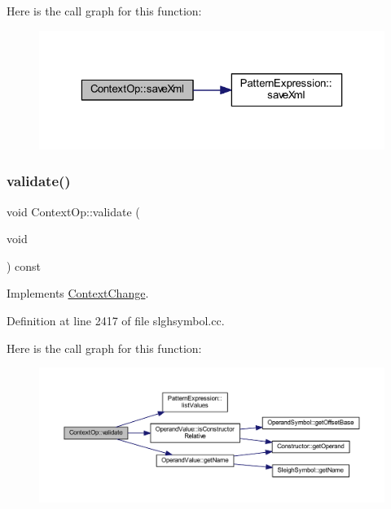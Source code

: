Here is the call graph for this function\+:
\nopagebreak
\begin{figure}[H]
\begin{center}
\leavevmode
\includegraphics[width=323pt]{class_context_op_ab0ddc8b720a9958f4dff5dae7f6cd288_cgraph}
\end{center}
\end{figure}
\mbox{\label{class_context_op_af3861ab0ca59793e1ed5d361fce4eb34}} 
\subsubsection{\texorpdfstring{validate()}{validate()}}
{\footnotesize\ttfamily void Context\+Op\+::validate (\begin{DoxyParamCaption}\item[{void}]{ }\end{DoxyParamCaption}) const\hspace{0.3cm}{\ttfamily [virtual]}}



Implements \mbox{\hyperlink{class_context_change_a9a9263347e16d2e396e3963a43eb7ea8}{Context\+Change}}.



Definition at line 2417 of file slghsymbol.\+cc.

Here is the call graph for this function\+:
\nopagebreak
\begin{figure}[H]
\begin{center}
\leavevmode
\includegraphics[width=350pt]{class_context_op_af3861ab0ca59793e1ed5d361fce4eb34_cgraph}
\end{center}
\end{figure}


